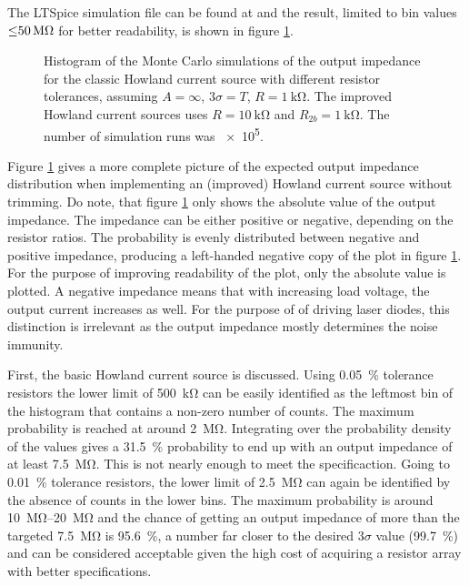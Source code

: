 The LTSpice simulation file can be found at  and the result, limited to bin values $\qty{\leq 50}{\mega\ohm}$ for better readability, is shown in figure \ref{fig:ltpsice_howland_mc_output_impedance}.
\begin{figure}[ht]
    \centering
    \caption{Histogram of the Monte Carlo simulations of the output impedance for the classic Howland current source with different resistor tolerances, assuming $A = \infty$, $3 \sigma = T$, $R=\qty{1}{\kilo\ohm}$. The improved Howland current sources uses $R = \qty{10}{\kilo\ohm}$ and $R_{2b} = \qty{1}{\kilo\ohm}$. The number of simulation runs was \num{e5}.}
    \label{fig:ltpsice_howland_mc_output_impedance}
\end{figure}

Figure \ref{fig:ltpsice_howland_mc_output_impedance} gives a more complete picture of the expected output impedance distribution when implementing an (improved) Howland current source without trimming. Do note, that figure \ref{fig:ltpsice_howland_mc_output_impedance} only shows the absolute value of the output impedance. The impedance can be either positive or negative, depending on the resistor ratios. The probability is evenly distributed between negative and positive impedance, producing a left-handed negative copy of the plot in figure \ref{fig:ltpsice_howland_mc_output_impedance}. For the purpose of improving readability of the plot, only the absolute value is plotted. A negative impedance means that with increasing load voltage, the output current increases as well. For the purpose of of driving laser diodes, this distinction is irrelevant as the output impedance mostly determines the noise immunity.

First, the basic Howland current source is discussed. Using \qty{0.05}{\percent} tolerance resistors the lower limit of \qty{500}{\kilo\ohm} can be easily identified as the leftmost bin of the histogram that contains a non-zero number of counts. The maximum probability is reached at around \qty{2}{\mega\ohm}. Integrating over the probability density of the values gives a \qty{31.5}{\percent} probability to end up with an output impedance of at least \qty{7.5}{\mega\ohm}. This is not nearly enough to meet the specificaction. Going to \qty{0.01}{\percent} tolerance resistors, the lower limit of \qty{2.5}{\mega\ohm} can again be identified by the absence of counts in the lower bins. The maximum probability is around \qtyrange{10}{20}{\mega\ohm} and the chance of getting an output impedance of more than the targeted \qty{7.5}{\mega\ohm} is \qty{95.6}{\percent}, a number far closer to the desired $3\sigma$ value (\qty{99.7}{\percent}) and can be considered acceptable given the high cost of acquiring a resistor array with better specifications.

